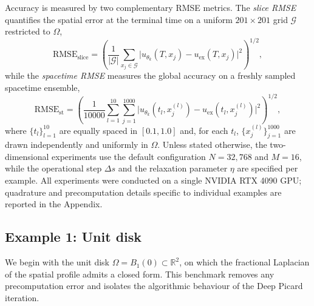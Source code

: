 \documentclass[a4paper,fleqn]{cas-sc}
\begin{document}
Accuracy is measured by two complementary RMSE metrics. The \emph{slice RMSE}
quantifies the spatial error at the terminal time on a uniform
$201\times 201$ grid $\mathcal{G}$ restricted to $\Omega$,
\begin{equation}\label{eq:slice-rmse}
\mathrm{RMSE}_{\mathrm{slice}}
=
\left(\frac{1}{|\mathcal{G}|}\sum_{x_j\in\mathcal{G}}
\bigl|u_{\theta_k}(T,x_j)-u_{\mathrm{ex}}(T,x_j)\bigr|^2\right)^{1/2},
\end{equation}
while the \emph{spacetime RMSE} measures the global accuracy on a freshly
sampled spacetime ensemble,
\begin{equation}\label{eq:spacetime-rmse}
\mathrm{RMSE}_{\mathrm{st}}
=
\left(\frac{1}{10000}\sum_{l=1}^{10}\sum_{j=1}^{1000}
\bigl|u_{\theta_k}(t_l,x_j^{(l)})-u_{\mathrm{ex}}(t_l,x_j^{(l)})\bigr|^2\right)^{1/2},
\end{equation}
where $\{t_l\}_{l=1}^{10}$ are equally spaced in $[0.1,1.0]$ and, for each
$t_l$, $\{x_j^{(l)}\}_{j=1}^{1000}$ are drawn independently and uniformly in
$\Omega$. Unless stated otherwise, the two-dimensional experiments use the
default configuration $N=32{,}768$ and $M=16$, while the operational
step $\Delta s$ and the relaxation parameter $\eta$ are specified per example.
All experiments were conducted on a single NVIDIA RTX 4090 GPU; quadrature and
precomputation details specific to individual examples are reported in the
Appendix.

\subsection{Example 1: Unit disk}\label{subsec:disk}

We begin with the unit disk $\Omega=B_1(0)\subset\mathbb{R}^2$, on which the
fractional Laplacian of the spatial profile admits a closed form. This
benchmark removes any precomputation error and isolates the algorithmic
behaviour of the Deep Picard iteration.
\end{document}
